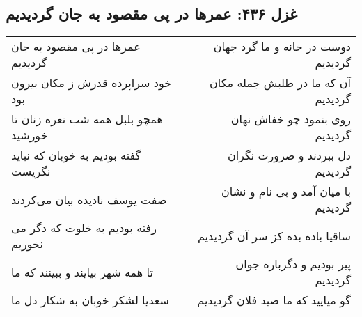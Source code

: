 \begin{center}
\section*{غزل ۴۳۶: عمرها در پی مقصود به جان گردیدیم}
\label{sec:436}
\begin{longtable}{l p{0.5cm} r}
عمرها در پی مقصود به جان گردیدیم
&&
دوست در خانه و ما گرد جهان گردیدیم
\\
خود سراپرده قدرش ز مکان بیرون بود
&&
آن که ما در طلبش جمله مکان گردیدیم
\\
همچو بلبل همه شب نعره زنان تا خورشید
&&
روی بنمود چو خفاش نهان گردیدیم
\\
گفته بودیم به خوبان که نباید نگریست
&&
دل ببردند و ضرورت نگران گردیدیم
\\
صفت یوسف نادیده بیان می‌کردند
&&
با میان آمد و بی نام و نشان گردیدیم
\\
رفته بودیم به خلوت که دگر می نخوریم
&&
ساقیا باده بده کز سر آن گردیدیم
\\
تا همه شهر بیایند و ببینند که ما
&&
پیر بودیم و دگرباره جوان گردیدیم
\\
سعدیا لشکر خوبان به شکار دل ما
&&
گو میایید که ما صید فلان گردیدیم
\\
\end{longtable}
\end{center}
